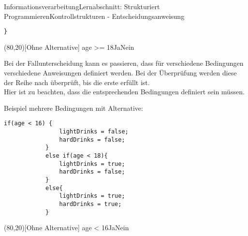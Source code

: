 \documentclass[11pt,oneside,openany,headings=optiontotoc,11pt,numbers=noenddot]{article}
\begin{document}
\begin{worksheet}{Informationsverarbeitung}{Lernabschnitt: Strukturiert Programmieren}{Kontrollstrukturen - Entscheidungsanweisung}
\begin{minipage}[t]{0.48\textwidth}
\begin{lstlisting}[style=Python,frame=single]
			}
			\end{lstlisting}
		\end{minipage}
		\hfill
		\begin{minipage}[t]{0.48\textwidth}
			\vspace*{0pt}
			\begin{struktogramm}(80,20)[Ohne Alternative]
				{age >= 18}{Ja}{Nein}
				\change
				\ifend
			\end{struktogramm}
		\end{minipage}
		\par\noindent
		Bei der Fallunterscheidung kann es passieren, dass für verschiedene Bedingungen verschiedene Anweisungen definiert werden. Bei der Überprüfung werden diese der Reihe nach überprüft, bis die erste erfüllt ist.\\
		Hier ist zu beachten, dass die entsprechenden Bedingungen definiert sein müssen.
		\par\noindent
		\begin{minipage}[t]{0.48\textwidth}
			\vspace*{0pt}
			Beispiel mehrere Bedingungen mit Alternative:
			\begin{lstlisting}[style=Python,frame=single]
			if(age < 16) {
				lightDrinks = false;
				hardDrinks = false;
			}
			else if(age < 18){
				lightDrinks = true;
				hardDrinks = false;
			}
			else{
				lightDrinks = true;
				hardDrinks = true;
			}
			\end{lstlisting}
		\end{minipage}
		\hfill
		\begin{minipage}[t]{0.48\textwidth}
			\vspace*{0pt}
			\begin{struktogramm}(80,20)[Ohne Alternative]
				{age < 16}{Ja}{Nein}
				\change
				\change
				\ifend
				\ifend
			\end{struktogramm}
		\end{minipage}

\end{worksheet}
\end{document}
